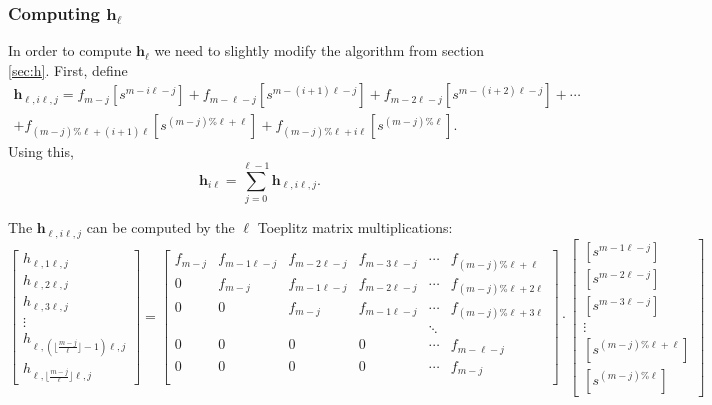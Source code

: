\documentclass[a4paper]{article}
\begin{document}
\subsubsection{Computing $\mathbf{h_\ell}$}\label{sec:hl}

In order to compute $\mathbf{h_\ell}$ we need to slightly modify the algorithm from section \ref{sec:h}. First, define
\begin{multline}
\mathbf{h}_{\ell, i\ell, j} = f_{m-j}[s^{m-i\ell-j}] + f_{m-\ell-j}[s^{m-(i+1)\ell-j}] + f_{m-2\ell-j}[s^{m-(i+2)\ell-j}] + \cdots\\ + f_{(m - j) \% \ell + (i+1)\ell}[s^{(m-j)\% \ell + \ell}]  + f_{(m - j) \% \ell + i\ell}[s^{(m-j)\% \ell}].
\end{multline}
Using this,
\begin{equation}
\mathbf{h}_{i\ell} = \sum_{j=0}^{\ell-1}\mathbf{h}_{\ell, i\ell, j}\text{.}
\end{equation}

The $\mathbf{h}_{\ell, i\ell, j}$ can be computed by the $\ell$ Toeplitz matrix multiplications:
$$
\begin{bmatrix}
h_{\ell,1\ell,j}\\
h_{\ell,2\ell,j}\\
h_{\ell,3\ell,j}\\
\vdots\\
h_{\ell,(\lfloor \frac{m-j}{\ell}\rfloor-1)\ell,j}\\
h_{\ell,\lfloor \frac{m-j}{\ell}\rfloor\ell,j}
\end{bmatrix}= \begin{bmatrix}
f_{m-j} &f_{m-1\ell-j}&f_{m-2\ell-j}&f_{m-3\ell-j}&\cdots & f_{(m - j) \% \ell + \ell}\\
0& f_{m-j} &f_{m-1\ell-j}&f_{m-2\ell-j}&\cdots & f_{(m - j) \% \ell + 2\ell}\\
0 & 0& f_{m-j} &f_{m-1\ell-j}&\cdots & f_{(m - j) \% \ell + 3\ell}\\
&&&&\ddots&\\
0 & 0& 0 &0&\cdots & f_{m-\ell-j}\\
0 & 0& 0 &0&\cdots & f_{m-j}\\
\end{bmatrix}\cdot\begin{bmatrix}
[s^{m-1\ell-j}]\\
[s^{m-2\ell-j}]\\
[s^{m-3\ell-j}]\\
\vdots\\
[s^{(m-j)\% \ell + \ell}]\\
[s^{(m-j)\% \ell}]
\end{bmatrix}
$$
\end{document}
